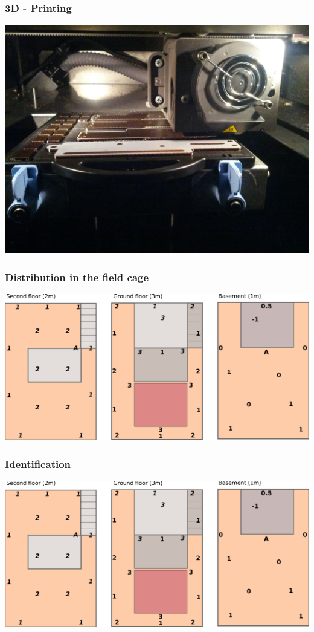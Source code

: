 \documentclass[t]{beamer}
\begin{document}
\begin{frame}[c]
    \frametitle{3D - Printing}
  \begin{center}
  	\includegraphics[width=0.8\linewidth]{img/pic/IMG_20140530_184940.jpg}\\
  \vspace{0.5cm}
  \end{center}
\end{frame}
\begin{frame}[c]
    \frametitle{Distribution in the field cage}
  \begin{center}
  	\includegraphics[width=0.9\linewidth]{img/installPlan.pdf}\\
  \vspace{0.5cm}
  \end{center}
\end{frame}
\begin{frame}[c]
    \frametitle{Identification}
  \begin{center}
  	\includegraphics[width=0.9\linewidth]{img/installPlan.pdf}\\
  \vspace{0.5cm}
  \end{center}
\end{frame}
\end{document}
